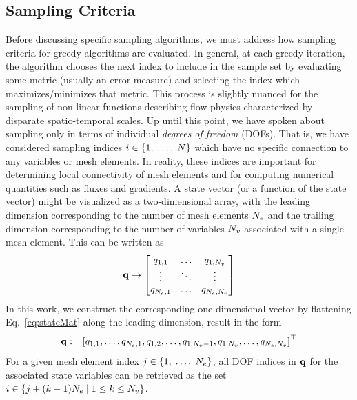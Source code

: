 \subsection{Sampling Criteria}
%
Before discussing specific sampling algorithms, we must address how sampling criteria for greedy algorithms are evaluated. In general, at each greedy iteration, the algorithm chooses the next index to include in the sample set by evaluating some metric (usually an error measure) and selecting the index which maximizes/minimizes that metric. This process is slightly nuanced for the sampling of non-linear functions describing flow physics characterized by disparate spatio-temporal scales. Up until this point, we have spoken about sampling only in terms of individual \textit{degrees of freedom} (DOFs). That is, we have considered sampling indices $i \in \{1,\; \hdots, \; N\}$ which have no specific connection to any variables or mesh elements. In reality, these indices are important for determining local connectivity of mesh elements and for computing numerical quantities such as fluxes and gradients. A state vector (or a function of the state vector) might be visualized as a two-dimensional array, with the leading dimension corresponding to the number of mesh elements $N_{e}$ and the trailing dimension corresponding to the number of variables $N_{v}$ associated with a single mesh element. This can be written as
%
\begin{equation}\label{eq:stateMat}
	\mathbf{q} \rightarrow
	\begin{bmatrix}
		q_{1,1} & \hdots & q_{1,N_{v}} \\
		\vdots & \ddots & \vdots \\
		q_{N_{e},1} & \hdots & q_{N_{e},N_{v}}
	\end{bmatrix}
\end{equation}
%
In this work, we construct the corresponding one-dimensional vector by flattening Eq.~\ref{eq:stateMat} along the leading dimension, result in the form
%
\begin{equation}
	\mathbf{q} := \left[q_{1,1}, \hdots, q_{N_{e},1},q_{1,2}, \hdots, q_{1,N_{v}-1}, q_{1,N_{v}}, \hdots, q_{N_{e},N_{v}} \right]^\top
\end{equation}
%
For a given mesh element index $j \in \{1,\; \hdots,\; N_{e}\}$, all DOF indices in $\mathbf{q}$ for the associated state variables can be retrieved as the set $i \in \{j + (k-1) N_{e} \; \vert \; 1 \le k \le N_{v} \}$.

